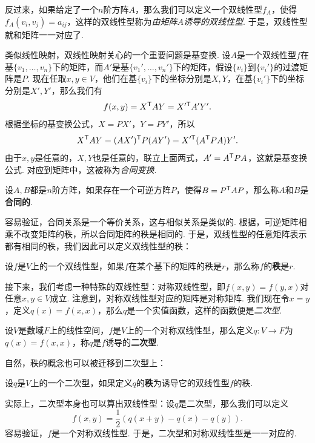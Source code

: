 反过来，如果给定了一个$n$阶方阵$A$，那么我们可以定义一个双线性型$f_A$，使得$f_A(v_i,v_j)=a_{ij}$，这样的双线性型称为\emph{由矩阵$A$诱导的双线性型}. 于是，双线性型就和矩阵一一对应了. 

类似线性映射，双线性映射关心的一个重要问题是基变换. 设$A$是一个双线性型$f$在基$\{v_1,\dots,v_n\}$下的矩阵，而$A'$是基$\{v_1',\dots,v_n'\}$下的矩阵，假设$\{v_i\}$到$\{v_i'\}$的过渡矩阵是$P$. 现在任取$x,y\in V$，他们在基$\{v_i\}$下的坐标分别是$X,Y$，在基$\{v_i'\}$下的坐标分别是$X',Y'$，那么我们有
\[
    f(x,y)=X^{\mathsf{T}} AY=X'^{\mathsf{T}} A'Y'.
\]
根据坐标的基变换公式，$X=PX'$，$Y=PY'$，所以
\[
    X^{\mathsf{T}} AY=(AX')^{\mathsf{T}} P(AY')=X'^{\mathsf{T}} (A^{\mathsf{T}} P A)Y'.
\]
由于$x,y$是任意的，$X,Y$也是任意的，联立上面两式，$A'=A^{\mathsf{T}} P A$，这就是基变换公式. 对应到矩阵中，这被称为\emph{合同变换}. 

\begin{definition}[合同矩阵]\label{def:congruent-matrix}
    设$A,B$都是$n$阶方阵，如果存在一个可逆方阵$P$，使得$B=P^{\mathsf{T}} A P$，那么称$A$和$B$是\textbf{合同的}. 
\end{definition}

容易验证，合同关系是一个等价关系，这与相似关系是类似的. 根据，可逆矩阵相乘不改变矩阵的秩，所以合同矩阵的秩是相同的. 于是，双线性型的任意矩阵表示都有相同的秩，我们因此可以定义双线性型的秩：

\begin{definition}[双线性型的秩]\label{def:bilinear-form-rank}
    设$f$是$V$上的一个双线性型，如果$f$在某个基下的矩阵的秩是$r$，那么称$f$的\textbf{秩}是$r$.
\end{definition}

接下来，我们考虑一种特殊的双线性型：对称双线性型，即$f(x,y)=f(y,x)$对任意$x,y\in V$成立. 注意到，对称双线性型对应的矩阵是对称矩阵. 我们现在令$x=y$，定义$q(x)=f(x,x)$，那么$q$是一个实值函数，这样的函数便是\emph{二次型}. 

\begin{definition}[二次型]\label{def:quadratic-form}
    设$V$是数域$F$上的线性空间，$f$是$V$上的一个对称双线性型，那么定义$q:V\to F$为$q(x)=f(x,x)$，称$q$是$f$诱导的\textbf{二次型}. 
\end{definition}

自然，秩的概念也可以被迁移到二次型上：
\begin{definition}[二次型的秩]\label{def:quadratic-form-rank}
设$q$是$V$上的一个二次型，如果定义$q$的\textbf{秩}为诱导它的双线性型$f$的秩. 
\end{definition}

实际上，二次型本身也可以算出双线性型：设$q$是二次型，那么我们可以定义
\[f(x,y)=\frac{1}{2}(q(x+y)-q(x)-q(y)).\]
容易验证，$f$是一个对称双线性型. 于是，二次型和对称双线性型是一一对应的. 

